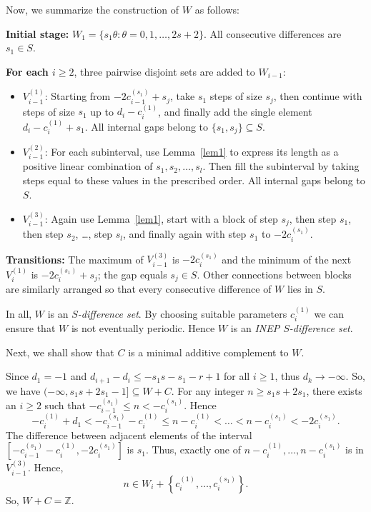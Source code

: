 \documentclass[12pt]{article}
\numberwithin{equation}{section}
\begin{document}
Now, we summarize the construction of $W$ as follows:

\textbf{Initial stage:}
\(W_1 = \{ s_1\theta : \theta = 0,1,\dots,2s+2\}\). All consecutive differences are \(s_1\in S\).

\textbf{For each \(i \ge 2\)}, three pairwise disjoint sets are added to \(W_{i-1}\):
\begin{itemize}
    \item \(V_{i-1}^{(1)}\): Starting from \(-2c_{i-1}^{(s_1)}+s_j\), take \(s_1\) steps of size \(s_j\), then continue with steps of size \(s_1\) up to \(d_i-c_i^{(1)}\), and finally add the single element \(d_i-c_i^{(1)}+s_1\). All internal gaps belong to \(\{s_1,s_j\}\subseteq S\).

    \item \(V_{i-1}^{(2)}\): For each subinterval, use Lemma~\ref{lem1} to express its length as a positive linear combination of \(s_1,s_2,\dots,s_l\). Then fill the subinterval by taking steps equal to these values in the prescribed order.
    All internal gaps belong to \(S\).

    \item \(V_{i-1}^{(3)}\): Again use Lemma~\ref{lem1}, start with a block of step \(s_j\), then step \(s_1\), then step \(s_2\), \dots, step \(s_{l}\), and finally again with step \(s_1\) to \(-2c_i^{(s_1)}\).
\end{itemize}

\textbf{Transitions:} The maximum of \(V_{i-1}^{(3)}\) is \(-2c_i^{(s_1)}\) and the minimum of the next \(V_i^{(1)}\) is \(-2c_i^{(s_1)}+s_j\); the gap equals \(s_j\in S\). Other connections between blocks are similarly arranged so that every consecutive difference of \(W\) lies in \(S\).

In all, \(W\) is an \textit{\(S\)-difference set}. By choosing suitable parameters \(c_i^{(1)}\) we can ensure that \(W\) is not eventually periodic. Hence \(W\) is an \textit{INEP \(S\)-difference set}.

Next, we shall show that $C$ is a minimal additive complement to $W$.

Since $d_{1}=-1$ and $d_{i+1}-d_{i}\leqslant -s_1s-s_1-r+1$ for all $i\geq 1$, thus $d_k\rightarrow-\infty$. So, we have $(-\infty,s_1s+2s_1-1]\subseteq W+C$. For any integer
$n\geqslant s_1s+2s_1$, there exists an $i\geqslant 2$ such that $-c_{i-1}^{(s_1)}\leq n<-c_{i}^{(s_1)}$. Hence
$$-c_{i}^{(1)}+d_{1}<-c_{i-1}^{(s_1)}-c_{i}^{(1)}\leqslant n-c_{i}^{(1)}<\dots<n-c_{i}^{(s_1)}<-2c_{i}^{(s_1)}.$$
The difference between adjacent elements of the interval $\left[-c_{i-1}^{(s_1)}-c_{i}^{(1)},-2c_{i}^{(s_1)}\right]$ is $s_1$.
Thus, exactly one of ${n-c_{i}^{(1)},\dots,n-c_{i}^{(s_1)}}$ is in $V_{i-1}^{(3)}$. Hence, $$ n\in W_{i}+\left\{c_{i}^{(1)}, \dots,c_{i}^{(s_1)}\right\}.$$
So, $W+C=\mathbb{Z}$.
\end{document}
